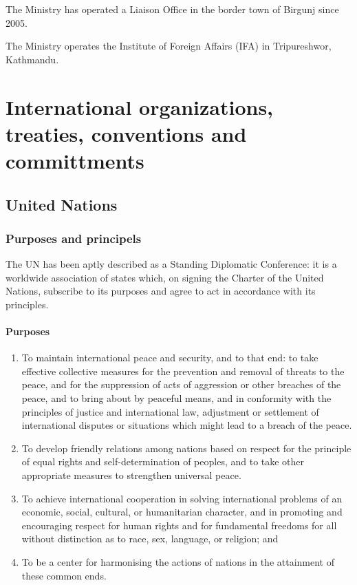 \documentclass[
  openany]{book}
\providecommand{\tightlist}{%
  \setlength{\itemsep}{0pt}\setlength{\parskip}{0pt}}
\begin{document}
The Ministry has operated a Liaison Office in the border town of Birgunj since 2005.

The Ministry operates the Institute of Foreign Affairs (IFA) in Tripureshwor, Kathmandu.

\hypertarget{international-organizations-treaties-conventions-and-committments}{%
\chapter{International organizations, treaties, conventions and committments}\label{international-organizations-treaties-conventions-and-committments}}

\hypertarget{united-nations}{%
\section{United Nations}\label{united-nations}}

\hypertarget{purposes-and-principels}{%
\subsection{Purposes and principels}\label{purposes-and-principels}}

The UN has been aptly described as a Standing Diplomatic Conference: it is a worldwide association of states which, on signing the Charter of the United Nations, subscribe to its purposes and agree to act in accordance with its principles.

\hypertarget{purposes}{%
\subsubsection{Purposes}\label{purposes}}

\begin{enumerate}
\def\labelenumi{\arabic{enumi}.}
\tightlist
\item
  To maintain international peace and security, and to that end: to take effective collective measures for the prevention and removal of threats to the peace, and for the suppression of acts of aggression or other breaches of the peace, and to bring about by peaceful means, and in conformity with the principles of justice and international law, adjustment or settlement of international disputes or situations which might lead to a breach of the peace.
\item
  To develop friendly relations among nations based on respect for the principle of equal rights and self-determination of peoples, and to take other appropriate measures to strengthen universal peace.
\item
  To achieve international cooperation in solving international problems of an economic, social, cultural, or humanitarian character, and in promoting and encouraging respect for human rights and for fundamental freedoms for all without distinction as to race, sex, language, or religion; and
\item
  To be a center for harmonising the actions of nations in the attainment of these common ends.
\end{enumerate}
\end{document}
